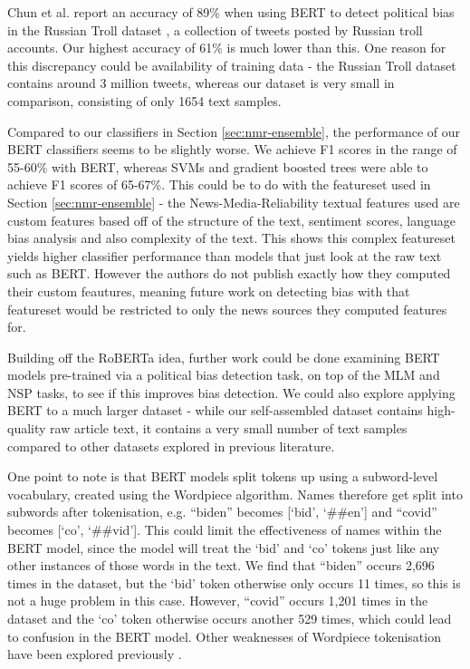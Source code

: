 Chun et al. report an accuracy of 89\% when using BERT to detect political bias in the Russian Troll dataset \cite{russian-troll}, a collection of tweets posted by Russian troll accounts. Our highest accuracy of 61\% is much lower than this. One reason for this discrepancy could be availability of training data - the Russian Troll dataset contains around 3 million tweets, whereas our dataset is very small in comparison, consisting of only 1654 text samples.

Compared to our classifiers in Section \ref{sec:nmr-ensemble}, the performance of our BERT classifiers seems to be slightly worse. We achieve F1 scores in the range of 55-60\% with BERT, whereas SVMs and gradient boosted trees were able to achieve F1 scores of 65-67\%. This could be to do with the featureset used in Section \ref{sec:nmr-ensemble} - the News-Media-Reliability textual features used are custom features based off of the structure of the text, sentiment scores, language bias analysis and also complexity of the text. This shows this complex featureset yields higher classifier performance than models that just look at the raw text such as BERT. However the authors do not publish exactly how they computed their custom feautures, meaning future work on detecting bias with that featureset would be restricted to only the news sources they computed features for.

Building off the RoBERTa idea, further work could be done examining BERT models pre-trained via a political bias detection task, on top of the MLM and NSP tasks, to see if this improves bias detection. We could also explore applying BERT to a much larger dataset - while our self-assembled dataset contains high-quality raw article text, it contains a very small number of text samples compared to other datasets explored in previous literature.

One point to note is that BERT models split tokens up using a subword-level vocabulary, created using the Wordpiece \cite{wordpiece} algorithm. Names therefore get split into subwords after tokenisation, e.g. ``biden'' becomes [`bid', `\#\#en'] and ``covid'' becomes [`co', `\#\#vid']. This could limit the effectiveness of names within the BERT model, since the model will treat the `bid' and `co' tokens just like any other instances of those words in the text. We find that ``biden'' occurs 2,696 times in the dataset, but the `bid' token otherwise only occurs 11 times, so this is not a huge problem in this case. However, ``covid'' occurs 1,201 times in the dataset and the `co' token otherwise occurs another 529 times, which could lead to confusion in the BERT model. Other weaknesses of Wordpiece tokenisation have been explored previously \cite{wordpiece-weaknesses}.

